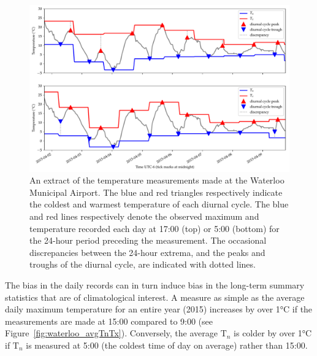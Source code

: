 \documentclass[letter]{article}
\makeatletter
\def\maxwidth{\ifdim\Gin@nat@width>\linewidth\linewidth
\else\Gin@nat@width\fi}
\let\Oldincludegraphics\includegraphics
\renewcommand{\includegraphics}[1]{\Oldincludegraphics[width=0.98\maxwidth]{#1}}
\newcommand{\T}{\mathrm{T}}
\newcommand{\Tn}{\T_{n}}
\makeatother
\begin{document}
 \begin{figure}[!ht]
\centering
\includegraphics{../figures/waterloo_triangles.pdf}
\caption{
\label{fig:waterloo_triangles}
An extract of the temperature measurements made at the Waterloo Municipal Airport.
The blue and red triangles respectively indicate the coldest and warmest temperature of each diurnal cycle.
The blue and red lines respectively denote the observed maximum and temperature recorded each day at 17:00 (top) or 5:00 (bottom) for the 24-hour period preceding the measurement.
The occasional discrepancies between the 24-hour extrema, and the peaks and troughs of the diurnal cycle, are indicated with dotted lines.
}
\end{figure}

The bias in the daily records can in turn induce bias in the long-term summary statistics that are of climatological interest.
A measure as simple as the average daily maximum temperature for an entire year (2015) increases by over 1°C if the measurements are made at 15:00 compared to 9:00 (see Figure~\ref{fig:waterloo_avgTnTx}).
Conversely, the average \(\Tn\) is colder by over 1°C if \(\Tn\) is measured at 5:00 (the coldest time of day on average) rather than 15:00.
\end{document}
